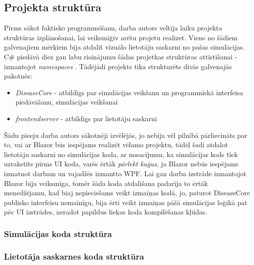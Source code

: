 \subsection{Projekta struktūra}

Pirms sākot faktisko programmēšanu, darba autors veltīja laiku projekta
struktūras izplānošanai, lai veiksmīģiv arētu projetu realizet. Viens no šādiem
galvenajiem mērķiem bija atdalīt vizuālo lietotāju saskarni no pašas simulācijas.
C\# piedāvā diez gan labu risinājumu šādas projetkas struktūras attīstīšanai - izmantojot
\emph{namespaces} \cite{csharp:namespaces}. Tādējādi projekts tika strukturēts
divās galvenajās pakotnēs:

\begin{itemize}
    \item \emph{DiseaseCore} - atbildīgs par simulācijas veikšanu un programmiskā
        interfeisa piedāvāšanu, simulācijas veikšanai
    \item \emph{frontendserver} - atbildīgs par lietotāju saskarni
\end{itemize}

Šādu pieeju darba autors sākotnēji izvēlējās, jo nebija vēl pilnībā pārliecināts
par to, vai ar Blazor būs iespējams realizēt vēlamo projektu, tādēļ šadi atdalot
lietotāju saskarni no simulācijas koda, ar nosacījumu, ka simulācijas kods tiek
uzrakstīts pirms UI koda, varēs ērtāk \emph{pārlekt kuģus}, ja Blazor nebūs
iespējams izmatnot darbam un vajadžēs izmantto WPF. Lai gan darba izstrāde
izmantojot Blazor bija veiksmīga, tomēr šāda koda atdalīšana padarīja to ērtāk
menedžējamu, kad biaj nepieciešams veikt izmaiņas kodā, jo, paturot DiseaseCore
publisko interfeisu nemainīgu, bija ērti veikt izmaiņas pāšā simulācijas loģikā
pat pēc UI izstrādes, neradot papildus liekas koda kompilēšanas kļūdas.

\subsubsection*{Simulācijas koda struktūra}


\subsubsection*{Lietotāja saskarnes koda struktūra}
